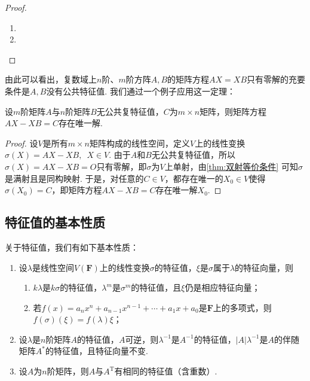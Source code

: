 \begin{proof}
    \begin{enumerate}
        \item

        \item
    \end{enumerate}
\end{proof}

由此可以看出，复数域上$n$阶、$m$阶方阵$A,B$的矩阵方程$AX=XB$只有零解的充要条件是$A,B$没有公共特征值. 我们通过一个例子应用这一定理：
\begin{example}{}{}
    设$m$阶矩阵$A$与$n$阶矩阵$B$无公共复特征值，$C$为$m\times n$矩阵，则矩阵方程$AX-XB=C$存在唯一解.
\end{example}

\begin{proof}
    设$V$是所有$m\times n$矩阵构成的线性空间，定义$V$上的线性变换$\sigma(X)=AX-XB,\enspace X\in V$. 由于$A$和$B$无公共复特征值，所以$\sigma(X)=AX-XB=O$只有零解，即$\sigma$为$V$上单射，由\autoref{thm:双射等价条件} 可知$\sigma$是满射且是同构映射. 于是，对任意的$C\in V$，都存在唯一的$X_0\in V$使得$\sigma(X_0)=C$，即矩阵方程$AX-XB=C$存在唯一解$X_0$.
\end{proof}

\subsection{特征值的基本性质}

关于特征值，我们有如下基本性质：
\begin{enumerate}
    \item 设$\lambda$是线性空间$V(\mathbf{F})$上的线性变换$\sigma$的特征值，$\xi$是$\sigma$属于$\lambda$的特征向量，则
          \begin{enumerate}
              \item $k\lambda$是$k\sigma$的特征值，$\lambda^m$是$\sigma^m$的特征值，且$\xi$仍是相应特征向量；

              \item 若$f(x)=a_nx^n+a_{n-1}x^{n-1}+\cdots+a_1x+a_0$是$\mathbf{F}$上的多项式，则$f(\sigma)(\xi)=f(\lambda)\xi$；
          \end{enumerate}

    \item 设$\lambda$是$n$阶矩阵$A$的特征值，$A$可逆，则$\lambda^{-1}$是$A^{-1}$的特征值，$|A|\lambda^{-1}$是$A$的伴随矩阵$A^*$的特征值，且特征向量不变.

    \item 设$A$为$n$阶矩阵，则$A$与$A^\mathrm{T}$有相同的特征值（含重数）.
\end{enumerate}

